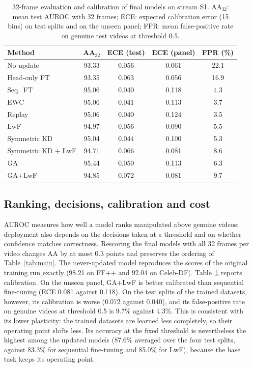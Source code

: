 \documentclass{ieeeaccess}
\newcommand{\ffpp}{FF{+}{+}}
\begin{document}
\begin{table}[t]
\caption{32-frame evaluation and calibration of final models on stream S1. AA$_{32}$: mean test AUROC with 32 frames; ECE: expected calibration error (15 bins) on test splits and on the unseen panel; FPR: mean false-positive rate on genuine test videos at threshold 0.5.}
\label{tab:calib}
\centering
\footnotesize
\setlength{\tabcolsep}{3.5pt}
\begin{tabular}{@{}lcccc@{}}
\toprule
Method & AA$_{32}$ & ECE (test) & ECE (panel) & FPR (\%) \\
\midrule
No update & 93.33 & 0.056 & 0.061 & 22.1 \\
Head-only FT & 93.35 & 0.063 & 0.056 & 16.9 \\
Seq.\ FT & 95.06 & 0.040 & 0.118 & 4.3 \\
EWC & 95.06 & 0.041 & 0.113 & 3.7 \\
Replay & 95.06 & 0.040 & 0.124 & 3.5 \\
LwF & 94.97 & 0.056 & 0.090 & 5.5 \\
Symmetric KD & 95.04 & 0.044 & 0.100 & 5.3 \\
Symmetric KD + LwF & 94.71 & 0.066 & 0.081 & 8.6 \\
GA & 95.44 & 0.050 & 0.113 & 6.3 \\
GA+LwF & 94.85 & 0.072 & 0.081 & 9.7 \\
\bottomrule
\end{tabular}
\end{table}

\subsection{Ranking, decisions, calibration and cost}
\label{sec:calib}
AUROC measures how well a model ranks manipulated above genuine videos; deployment also depends on the decisions taken at a threshold and on whether confidence matches correctness. Rescoring the final models with all 32 frames per video changes AA by at most 0.3 points and preserves the ordering of Table~\ref{tab:main}. The never-updated model reproduces the scores of the original training run exactly (98.21 on \ffpp{} and 92.04 on Celeb-DF). Table~\ref{tab:calib} reports calibration. On the unseen panel, GA+LwF is better calibrated than sequential fine-tuning (ECE 0.081 against 0.118). On the test splits of the trained datasets, however, its calibration is worse (0.072 against 0.040), and its false-positive rate on genuine videos at threshold 0.5 is 9.7\% against 4.3\%. This is consistent with its lower plasticity: the trained datasets are learned less completely, so their operating point shifts less. Its accuracy at the fixed threshold is nevertheless the highest among the updated models (87.6\% averaged over the four test splits, against 83.3\% for sequential fine-tuning and 85.0\% for LwF), because the base task keeps its operating point.
\end{document}
